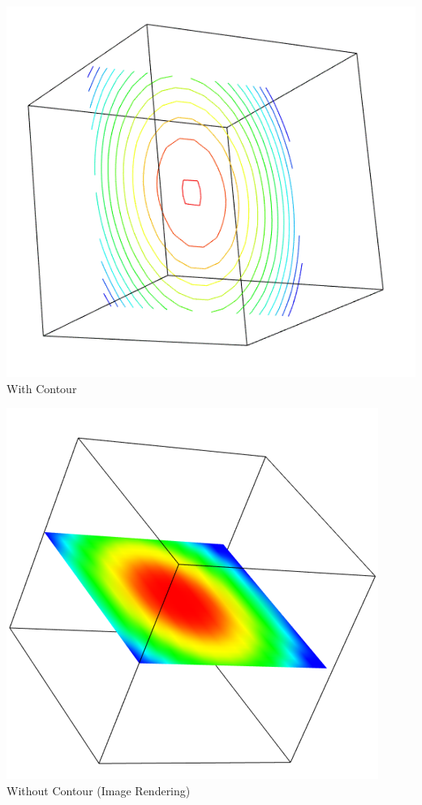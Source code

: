 \documentclass[11pt,a4paper,oneside]{article}
\begin{document}
	\begin{center}
		\includegraphics[scale=0.4]{1.png}	\\
		With Contour	
	\end{center}

    \begin{center}
    	\includegraphics[scale=0.5]{3.png} \\
    	Without Contour (Image Rendering)	
    \end{center}
\end{document}

